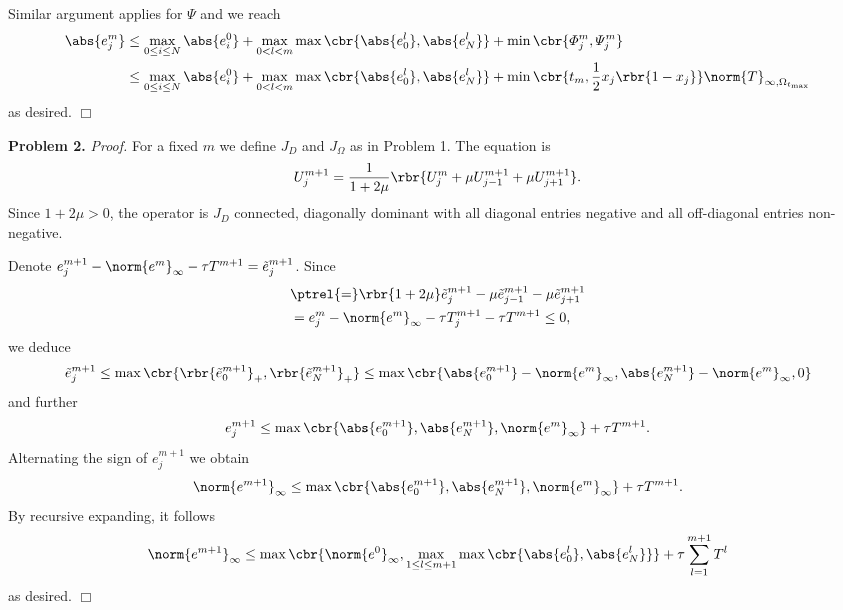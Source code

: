 \documentclass[english, nochinese]{pnote}
\begin{document}
Similar argument applies for $\varPsi$ and we reach
\begin{equation}
\begin{split}
\abs{e_j^m} &\le \max_{ 0 \le i \le N } \abs{e_i^0} + \max_{ 0 < l < m } \max \cbr{ \abs{e_0^l}, \abs{e_N^l} } + \min \cbr{ \varPhi_j^m, \varPsi_j^m } \\
&\le \max_{ 0 \le i \le N } \abs{e_i^0} + \max_{ 0 < l < m } \max \cbr{ \abs{e_0^l}, \abs{e_N^l} } + \min \cbr{ t_m, \frac{1}{2} x_j \rbr{ 1 - x_j } } \norm{T}_{ \infty, \Omega_{t_{\text{max}}} }
\end{split}
\end{equation}
as desired.
\hfill$\Box$

\textbf{Problem 2.} \textit{Proof.} For a fixed $m$ we define $J_D$ and $J_{\Omega}$ as in Problem 1. The equation is
\begin{equation}
U_j^{ m + 1 } = \frac{1}{ 1 + 2 \mu } \rbr{ U_j^m + \mu U_{ j - 1 }^{ m + 1 } + \mu U_{ j + 1 }^{ m + 1 } }.
\end{equation}
Since $ 1 + 2 \mu > 0 $, the operator is $J_D$ connected, diagonally dominant with all diagonal entries negative and all off-diagonal entries non-negative.

Denote $ e_j^{ m + 1 } - \norm{e^m}_{\infty} - \tau T^{ m + 1 } = \tilde{e}_j^{ m + 1 } $. Since
\begin{equation}
\begin{split}
&\ptrel{=} \rbr{ 1 + 2 \mu } \tilde{e}_j^{ m + 1 } - \mu \tilde{e}_{ j - 1 }^{ m + 1 } - \mu \tilde{e}_{ j + 1 }^{ m + 1 } \\
&= e_j^m - \norm{e^m}_{\infty} - \tau T_j^{ m + 1 } - \tau T^{ m + 1 } \le 0,
\end{split}
\end{equation}
we deduce
\begin{equation}
\tilde{e}_j^{ m + 1 } \le \max \cbr{ \rbr{ \tilde{e}_0^{ m + 1 } }_+, \rbr{ \tilde{e}_N^{ m + 1 } }_+ } \le \max \cbr{ \abs{e_0^{ m + 1 }} - \norm{e^m}_{\infty}, \abs{e_N^{ m + 1 }} - \norm{e^m}_{\infty}, 0 }
\end{equation}
and further 
\begin{equation}
e_j^{ m + 1 } \le \max \cbr{ \abs{e_0^{ m + 1 }}, \abs{e_N^{ m + 1 }}, \norm{e^m}_{\infty} } + \tau T^{ m + 1 }.
\end{equation}
Alternating the sign of $ e_j^{ m + 1 } $ we obtain
\begin{equation}
\norm{e^{ m + 1 }}_{\infty} \le \max \cbr{ \abs{e_0^{ m + 1 }}, \abs{e_N^{ m + 1 }}, \norm{e^m}_{\infty} } + \tau T^{ m + 1 }.
\end{equation}
By recursive expanding, it follows
\begin{equation}
\norm{e^{ m + 1 }}_{\infty} \le \max \cbr{ \norm{e^0}_{\infty}, \max_{ 1 \le l \le m + 1 } \max \cbr{ \abs{e_0^l}, \abs{e_N^l} } } + \tau \sum_{ l = 1 }^{ m + 1 } T^l
\end{equation}
as desired.
\hfill$\Box$
\end{document}
